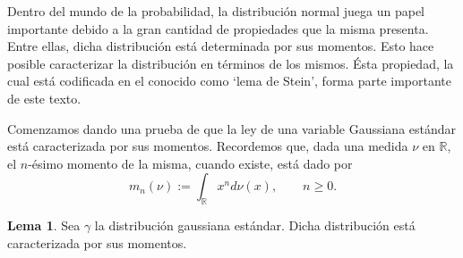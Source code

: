 \documentclass[letterpaper,twoside,12pt]{book}
\newcommand{\R}{\mathbb{R}}
\newcommand{\1}{\mathds{1}}
\theoremstyle{definition}
\theoremstyle{definition}
\theoremstyle{remark}
\theoremstyle{definition}
\theoremstyle{definition}
\theoremstyle{definition}
\theoremstyle{definition}
\theoremstyle{definition}
\newtheorem{lema}{Lema}
\begin{document}
Dentro del mundo de la probabilidad, la distribución normal juega un papel importante debido a la gran cantidad de propiedades que la misma presenta. Entre ellas, dicha distribución está determinada por sus momentos. Esto hace posible caracterizar la distribución en términos de los mismos. Ésta propiedad, la cual está codificada en el conocido como `lema de Stein', forma parte importante de este texto. 

Comenzamos dando una prueba de que la ley de una variable Gaussiana estándar está caracterizada por sus momentos. Recordemos que, dada una medida $\nu$ en $\R$, el $n$-ésimo momento de la misma, cuando existe, está dado por 
\[
   m_n(\nu):=\int_{\R}x^{n}d\nu(x), \qquad n\geq0.
\]

\begin{lema} 
 Sea $\gamma$ la distribución gaussiana estándar. Dicha distribución está caracterizada por sus momentos.
 \end{lema}
\end{document}
